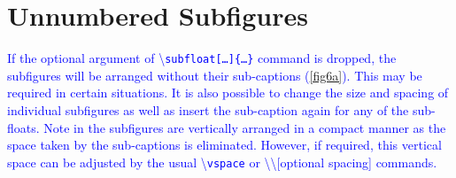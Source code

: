 \documentclass[phd,showgrids]{ndsu-thesis-2022}
\newcommand\italk[1]{\textcolor{blue}{#1}}  %
\newcommand\cmd[1]{\textbackslash\texttt{#1}}  %
\begin{document}
\section{Unnumbered Subfigures}
\italk{If the optional argument of \cmd{subfloat[\ldots]\{\ldots\}} command is dropped, the subfigures will be arranged without their sub-captions (\cref{fig6a}). This may be required in certain situations. It is also possible to change the size and spacing of individual subfigures as well as insert the sub-caption again for any of the sub-floats. Note in \Cref{fig6a} the subfigures are vertically arranged in a compact manner as the space taken by the sub-captions is eliminated. However, if required, this vertical space can be adjusted by the usual \cmd{vspace} or \textbackslash\textbackslash [optional spacing] commands.  
}
\end{document}
